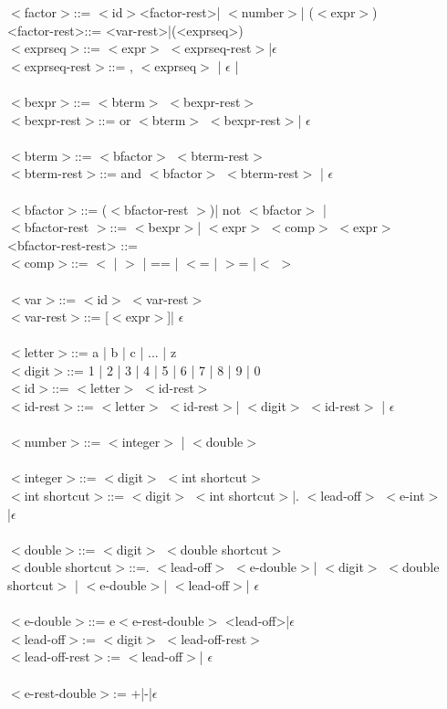 \documentclass[fleqn]{article}
\begin{document}
$<$factor$>$::= $<$id$>$<factor-rest>| $<$number$>$| ($<$expr$>$)\\
<factor-rest>::= <var-rest>|(<exprseq>)
\\
$<$exprseq$>$::= $<$expr$>$ $<$exprseq-rest$>$|$\epsilon$\\
$<$exprseq-rest$>$::= , $<$exprseq$>$ | $\epsilon$ | \\
\\
$<$bexpr$>$::= $<$bterm$>$ $<$bexpr-rest$>$\\
$<$bexpr-rest$>$::=  or $<$bterm$>$ $<$bexpr-rest$>$| $\epsilon$\\
\\
$<$bterm$>$::= $<$bfactor$>$ $<$bterm-rest$>$ \\
$<$bterm-rest$>$::=  and $<$bfactor$>$ $<$bterm-rest$>$ | $\epsilon$\\
\\
$<$bfactor$>$::= ($<$bfactor-rest $>$)| not $<$bfactor$>$ | \\
$<$bfactor-rest $>$::= $<$bexpr$>$| $<$expr$>$ $<$comp$>$ $<$expr$>$\\
<bfactor-rest-rest> ::= 
\\
$<$comp$>$::= $<$ | $>$ | == | $<$= | $>$= |$<$ $>$\\
\\
$<$var$>$::= $<$id$>$ $<$var-rest$>$\\
$<$var-rest$>$::= [$<$expr$>$]| $\epsilon$\\
\\
$<$letter$>$::= a | b | c | ... | z \\
$<$digit$>$::= 1 | 2 | 3 | 4 | 5 | 6 | 7 | 8 | 9 | 0\\
$<$id$>$::= $<$letter$>$ $<$id-rest$>$\\
$<$id-rest$>$::= $<$letter$>$ $<$id-rest$>$|  $<$digit$>$ $<$id-rest$>$ | $\epsilon$\\
\\
$<$number$>$::= $<$integer$>$ | $<$double$>$ \\
\\
$<$integer$>$::= $<$digit$>$ $<$int shortcut$>$\\
$<$int shortcut$>$::= $<$digit$>$ $<$int shortcut$>$|. $<$lead-off$>$ $<$e-int$>$\\ |$\epsilon$\\
\\
$<$double$>$::= $<$digit$>$ $<$double shortcut$>$\\
$<$double shortcut$>$::=. $<$lead-off$>$ $<$e-double$>$| $<$digit$>$ $<$double shortcut$>$ | $<$e-double$>$| $<$lead-off$>$| $\epsilon$\\
\\
$<$e-double$>$::= e$<$e-rest-double$>$ <lead-off>|$\epsilon$\\
$<$lead-off$>$:= $<$digit$>$ $<$lead-off-rest$>$\\ 
$<$lead-off-rest$>$:=  $<$lead-off$>$| $\epsilon$\\ 
\\
$<$e-rest-double$>$:= +|-|$\epsilon$\\
\end{document}
